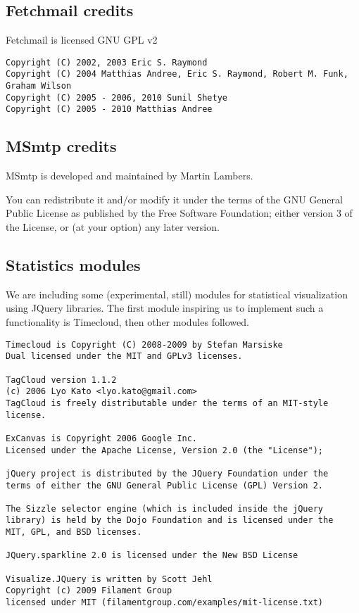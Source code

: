 \documentclass[a4,onecolumn,portrait]{article}
\begin{document}
\subsection{Fetchmail credits}
\label{sec-13-5}

Fetchmail is licensed GNU GPL v2

\begin{verbatim}
Copyright (C) 2002, 2003 Eric S. Raymond
Copyright (C) 2004 Matthias Andree, Eric S. Raymond, Robert M. Funk, Graham Wilson
Copyright (C) 2005 - 2006, 2010 Sunil Shetye
Copyright (C) 2005 - 2010 Matthias Andree
\end{verbatim}
\subsection{MSmtp credits}
\label{sec-13-6}

MSmtp is developed and maintained by Martin Lambers.

You can redistribute it and/or modify it under the terms of the GNU
General Public License as published by the Free Software Foundation;
either version 3 of the License, or (at your option) any later
version.
\subsection{Statistics modules}
\label{sec-13-7}
We are including some (experimental, still) modules for statistical
visualization using JQuery libraries. The first module inspiring us
to implement such a functionality is Timecloud, then other modules
followed.

\begin{verbatim}
Timecloud is Copyright (C) 2008-2009 by Stefan Marsiske
Dual licensed under the MIT and GPLv3 licenses.

TagCloud version 1.1.2
(c) 2006 Lyo Kato <lyo.kato@gmail.com>
TagCloud is freely distributable under the terms of an MIT-style license.

ExCanvas is Copyright 2006 Google Inc.
Licensed under the Apache License, Version 2.0 (the "License");

jQuery project is distributed by the JQuery Foundation under the
terms of either the GNU General Public License (GPL) Version 2.

The Sizzle selector engine (which is included inside the jQuery
library) is held by the Dojo Foundation and is licensed under the
MIT, GPL, and BSD licenses.

JQuery.sparkline 2.0 is licensed under the New BSD License

Visualize.JQuery is written by Scott Jehl
Copyright (c) 2009 Filament Group
licensed under MIT (filamentgroup.com/examples/mit-license.txt)
\end{verbatim}
\end{document}
